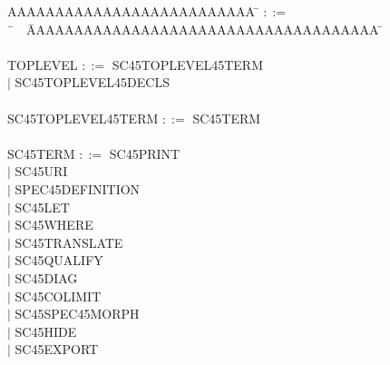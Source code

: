 
\newcommand{\bnf}[1]           {{#1}}
\newcommand{\bnfoptionalopen}  {{\bnf{$\big[$}    }}
\newcommand{\bnfoptionalclose} {{\bnf{$\big]$}    }}
\newcommand{\bnfrepeatopen}    {{\bnf{$\big\{$}   }}
\newcommand{\bnfrepeatclose}   {{\bnf{$\big\}^*$} }}
\newcommand{\bnfalternative}   {{\bnf{$|$}       }}

\newcommand{\grnonterminal}[1] {{\textup{\textsc {#1}} }}

\newcommand{\grterminal}[1]    {{\underline {\textup {\texttt {#1}}} }}

\newcommand{\grcomment}[1]    {{\textit {\textrm {#1}}}}

{\em
\begin{tabbing}
AAAAAAAAAAAAAAAAAAAAAAAAAA \= $::=$\=  \ \ \ \= AAAAAAAAAAAAAAAAAAAAAAAAAAAAAAAAAAAAA \= \kill
\\
\\ \grnonterminal {TOPLEVEL} \> $::=$ \> \>   \grnonterminal {SC\char45TOPLEVEL\char45TERM} 
\\  \>  \>   \bnfalternative \>  \grnonterminal {SC\char45TOPLEVEL\char45DECLS}
\\
\\ \grnonterminal {SC\char45TOPLEVEL\char45TERM} \> $::=$ \> \>    \grnonterminal {SC\char45TERM}
\\
\\ \grnonterminal {SC\char45TERM} \> $::=$ \> \>   \grnonterminal {SC\char45PRINT} 
\\  \>  \>   \bnfalternative \>  \grnonterminal {SC\char45URI} 
\\  \>  \>   \bnfalternative \>  \grnonterminal {SPEC\char45DEFINITION} 
\\  \>  \>   \bnfalternative \>  \grnonterminal {SC\char45LET} 
\\  \>  \>   \bnfalternative \>  \grnonterminal {SC\char45WHERE} 
\\  \>  \>   \bnfalternative \>  \grnonterminal {SC\char45TRANSLATE} 
\\  \>  \>   \bnfalternative \>  \grnonterminal {SC\char45QUALIFY} 
\\  \>  \>   \bnfalternative \>  \grnonterminal {SC\char45DIAG} 
\\  \>  \>   \bnfalternative \>  \grnonterminal {SC\char45COLIMIT} 
\\  \>  \>   \bnfalternative \>  \grnonterminal {SC\char45SPEC\char45MORPH} 
\\  \>  \>   \bnfalternative \>  \grnonterminal {SC\char45HIDE} 
\\  \>  \>   \bnfalternative \>  \grnonterminal {SC\char45EXPORT} 

\end{tabbing}}
